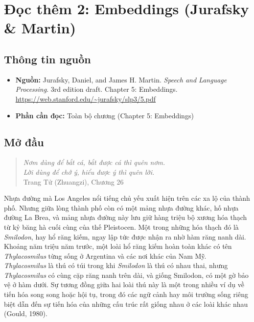 \chapter{Đọc thêm 2: Embeddings (Jurafsky \& Martin)}
\label{ch:M4L1DT2}


\section{Thông tin nguồn}

\begin{itemize}
  \item \textbf{Nguồn:} Jurafsky, Daniel, and James H. Martin. \emph{Speech and Language Processing}. 3rd edition draft. Chapter 5: Embeddings. \url{https://web.stanford.edu/~jurafsky/slp3/5.pdf}
  \item \textbf{Phần cần đọc:} Toàn bộ chương (Chapter 5: Embeddings)
\end{itemize}

\section*{Mở đầu}

\begin{quote}
\emph{Nơm dùng để bắt cá, bắt được cá thì quên nơm.} \\
\emph{Lời dùng để chở ý, hiểu được ý thì quên lời.} \\
Trang Tử (Zhuangzi), Chương 26
\end{quote}

Nhựa đường mà Los Angeles nổi tiếng chủ yếu xuất hiện trên các xa lộ của thành phố. Nhưng giữa lòng thành phố còn có một mảng nhựa đường khác, hố nhựa đường La Brea, và mảng nhựa đường này lưu giữ hàng triệu bộ xương hóa thạch từ kỷ băng hà cuối cùng của thế Pleistocen. Một trong những hóa thạch đó là \emph{Smilodon}, hay hổ răng kiếm, ngay lập tức được nhận ra nhờ hàm răng nanh dài. Khoảng năm triệu năm trước, một loài hổ răng kiếm hoàn toàn khác có tên \emph{Thylacosmilus} từng sống ở Argentina và các nơi khác của Nam Mỹ. \emph{Thylacosmilus} là thú có túi trong khi \emph{Smilodon} là thú có nhau thai, nhưng \emph{Thylacosmilus} có cùng cặp răng nanh trên dài, và giống Smilodon, có một gờ bảo vệ ở hàm dưới. Sự tương đồng giữa hai loài thú này là một trong nhiều ví dụ về tiến hóa song song hoặc hội tụ, trong đó các ngữ cảnh hay môi trường sống riêng biệt dẫn đến sự tiến hóa của những cấu trúc rất giống nhau ở các loài khác nhau (Gould, 1980).

